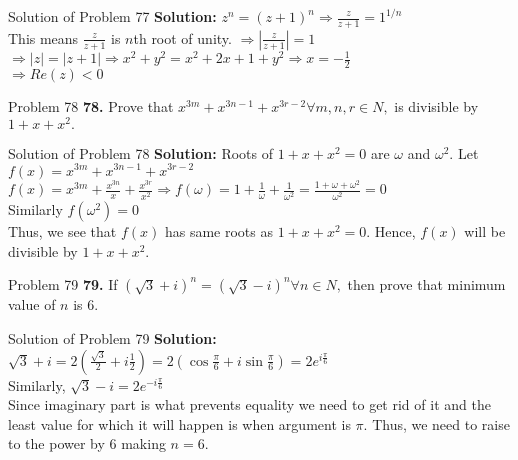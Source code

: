 \documentclass[aspectratio=169,8pt]{beamer}
\begin{document}
\begin{frame}{Solution of Problem 77}
  \textbf{Solution:} $z^n  = (z + 1)^n \Rightarrow \frac{z}{z + 1} = 1^{1/n}$\\
  \vspace*{0.2cm}
  This means $\frac{z}{z + 1}$ is $n$th root of unity. $\Rightarrow \left|\frac{z}{z + 1}\right| = 1$\\
  \vspace*{0.2cm}
  $\Rightarrow |z| = |z + 1| \Rightarrow x^2 + y^2 = x^2 + 2x + 1 + y^2 \Rightarrow x = -\frac{1}{2}$\\
  \vspace*{0.2cm}
  $\Rightarrow Re(z) < 0$
\end{frame}
\begin{frame}{Problem 78}
  \textbf{78.} Prove that $x^{3m} + x^{3n - 1} + x^{3r - 2} \forall m, n, r \in N,$ is divisible by $1 + x + x^2.$
\end{frame}
\begin{frame}{Solution of Problem 78}
  \textbf{Solution:} Roots of $1 + x + x^2 = 0$ are $\omega$ and $\omega^2.$ Let $f(x) = x^{3m} + x^{3n - 1} + x^{3r - 2}$\\
  \vspace*{0.2cm}
  $f(x) = x^{3m} + \frac{x^{3n}}{x} + \frac{x^{3r}}{x^2} \Rightarrow f(\omega) = 1 + \frac{1}{\omega} + \frac{1}{\omega^2} =
  \frac{1 + \omega + \omega^2}{\omega^2} = 0$\\
  \vspace*{0.2cm}
  Similarly $f(\omega^2) = 0$\\
  \vspace*{0.2cm}
  Thus, we see that $f(x)$ has same roots as $1 + x + x^2= 0.$ Hence, $f(x)$ will be divisible by $1 + x + x^2.$
\end{frame}
\begin{frame}{Problem 79}
  \textbf{79.} If $(\sqrt{3} + i)^n = (\sqrt{3} - i)^n \forall n\in N,$ then prove that minimum value of $n$ is $6.$
\end{frame}
\begin{frame}{Solution of Problem 79}
  \textbf{Solution:} $\sqrt{3} + i = 2\left(\frac{\sqrt{3}}{2} + i\frac{1}{2}\right) = 2\left(\cos\frac{\pi}{6} +
  i\sin\frac{\pi}{6}\right) = 2e^{i\frac{\pi}{6}}$\\
  \vspace*{0.2cm}
  Similarly, $\sqrt{3} - i = 2e^{-i\frac{\pi}{6}}$\\
  \vspace*{0.2cm}
  Since imaginary part is what prevents equality we need to get rid of it and the least value for which it will happen is when
  argument is $\pi.$ Thus, we need to raise to the power by $6$ making $n = 6.$
\end{frame}
\end{document}
